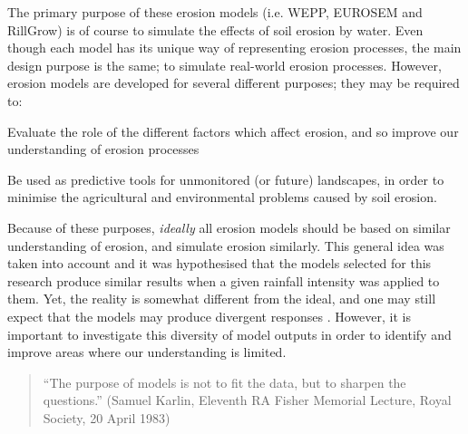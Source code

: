 The primary purpose of these erosion models (i.e. WEPP, EUROSEM and RillGrow) is
of course to simulate the effects of soil erosion by water.
Even though each model has its unique way of representing erosion
processes, the main design purpose is the same; to simulate real-world
erosion processes. However, erosion models are developed for several different
purposes; they may be required to:
\begin{itemize*}
  \item Evaluate the role of the different factors which affect erosion, and
so improve our understanding of erosion processes
  \item Be used as predictive tools for unmonitored (or future) landscapes, in
order to minimise the agricultural and environmental problems caused by soil
erosion.
\end{itemize*}
Because of these purposes, \emph{ideally} all erosion models should be based on
similar understanding of erosion, and simulate erosion similarly. %
This general idea was taken into account and it was hypothesised that the
models selected for this research produce similar results when a given
rainfall intensity was applied to them.
Yet, the reality is somewhat different from the ideal, and one may still expect
that the models may produce divergent responses
\citep{favis-mortlock1998-141,jetten1999-521}. However, it is important to
investigate this diversity of model outputs in order to identify and improve
areas where our understanding is limited.

\begin{quotation}
\small ``The purpose of models is not to fit the data, but to sharpen the
questions.'' (Samuel Karlin, Eleventh RA Fisher Memorial Lecture, Royal Society,
20 April 1983)
\end{quotation}

